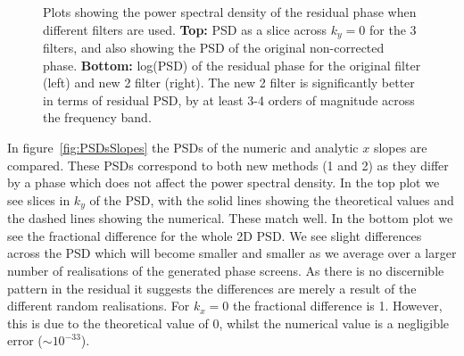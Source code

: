 \documentclass[pdf]{note}
\begin{document}
\begin{figure}[htdp]
{    }
    \caption{Plots showing the power spectral density of the residual phase when different filters are
    		used.  {\bf Top:} PSD as a slice across $k_y = 0$ for the 3 filters, and also showing the
		PSD of the original non-corrected phase.  {\bf Bottom:}  log(PSD) of the residual phase for
		the original filter (left) and new 2 filter (right).  The new 2 filter is significantly better in terms
		of residual PSD, by at least 3-4 orders of magnitude across the frequency band.
    }
    \label{fig:PSDsPhase}
\end{figure}

In figure~\ref{fig:PSDsSlopes} the PSDs of the numeric and analytic $x$ slopes are compared.
These PSDs correspond to both new methods (1 and 2) as they differ by a phase which does
not affect the power spectral density.  In the top plot we see slices in $k_y$ of the PSD,
with the solid lines showing the theoretical values and the dashed lines showing the
numerical.  These match well.  In the bottom plot we see the fractional difference
for the whole 2D PSD.  We see slight differences across the PSD which will become smaller
and smaller as we average over a larger number of realisations of the generated phase screens.
As there is no discernible pattern in the residual it suggests the differences are merely a result
of the different random realisations.
For $k_x = 0$ the fractional difference is 1.  However, this is due to the theoretical value of 0, whilst
the numerical value is a negligible error ($\sim 10^{-33}$).
\end{document}
